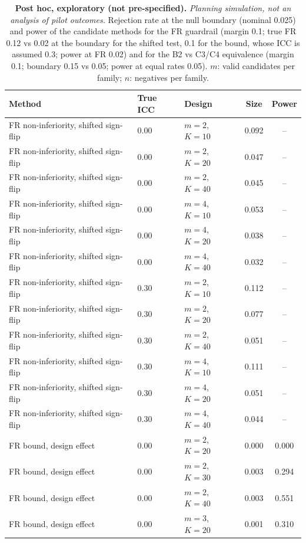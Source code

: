 \begin{table}[t]\centering\scriptsize
\caption{\textbf{Post hoc, exploratory (not pre-specified).} \emph{Planning simulation, not an analysis of pilot outcomes.} Rejection rate at the null boundary (nominal 0.025) and power of the candidate methods for the FR guardrail (margin 0.1; true FR 0.12 vs 0.02 at the boundary for the shifted test, 0.1 for the bound, whose ICC is assumed 0.3; power at FR 0.02) and for the B2 vs C3/C4 equivalence (margin 0.1; boundary 0.15 vs 0.05; power at equal rates 0.05). $m$: valid candidates per family; $n$: negatives per family.}\label{tab:plan-methods}
\begin{tabular}{lllcc}\toprule Method & True ICC & Design & Size & Power \\\midrule
FR non-inferiority, shifted sign-flip & 0.00 & $m=2$, $K=10$ & 0.092 & -- \\
FR non-inferiority, shifted sign-flip & 0.00 & $m=2$, $K=20$ & 0.047 & -- \\
FR non-inferiority, shifted sign-flip & 0.00 & $m=2$, $K=40$ & 0.045 & -- \\
FR non-inferiority, shifted sign-flip & 0.00 & $m=4$, $K=10$ & 0.053 & -- \\
FR non-inferiority, shifted sign-flip & 0.00 & $m=4$, $K=20$ & 0.038 & -- \\
FR non-inferiority, shifted sign-flip & 0.00 & $m=4$, $K=40$ & 0.032 & -- \\
FR non-inferiority, shifted sign-flip & 0.30 & $m=2$, $K=10$ & 0.112 & -- \\
FR non-inferiority, shifted sign-flip & 0.30 & $m=2$, $K=20$ & 0.077 & -- \\
FR non-inferiority, shifted sign-flip & 0.30 & $m=2$, $K=40$ & 0.051 & -- \\
FR non-inferiority, shifted sign-flip & 0.30 & $m=4$, $K=10$ & 0.111 & -- \\
FR non-inferiority, shifted sign-flip & 0.30 & $m=4$, $K=20$ & 0.051 & -- \\
FR non-inferiority, shifted sign-flip & 0.30 & $m=4$, $K=40$ & 0.044 & -- \\
FR bound, design effect & 0.00 & $m=2$, $K=20$ & 0.000 & 0.000 \\
FR bound, design effect & 0.00 & $m=2$, $K=30$ & 0.003 & 0.294 \\
FR bound, design effect & 0.00 & $m=2$, $K=40$ & 0.003 & 0.551 \\
FR bound, design effect & 0.00 & $m=3$, $K=20$ & 0.001 & 0.310 \\

\end{tabular}
\end{table}
